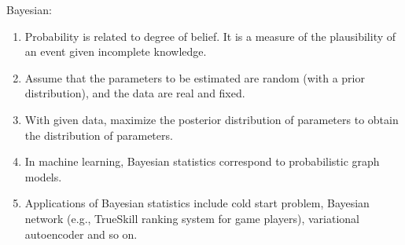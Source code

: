 \documentclass[12pt,oneside,a4paper]{article}
\numberwithin{equation}{section}
\begin{document}
Bayesian:
\begin{enumerate}
\item Probability is related to degree of belief.  It is a measure of the plausibility of an event given incomplete knowledge.

\item Assume that the parameters to be estimated are random (with a prior distribution), and the data are real and fixed.

\item With given data, maximize the posterior distribution of parameters to obtain the distribution of parameters. 

\item In machine learning, Bayesian statistics correspond to probabilistic graph models. 
\item Applications of Bayesian statistics include cold start problem, Bayesian network (e.g., TrueSkill ranking system for game players), variational autoencoder and so on.
\end{enumerate}
\end{document}
